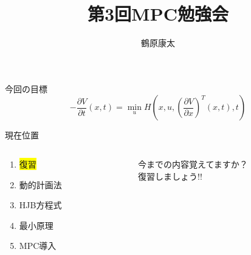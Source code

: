 \documentclass[dvipdfmx,12pt]{beamer}
\title{第3回MPC勉強会}
\author{鶴原康太}
\begin{document}
    \frame{\maketitle}

    \begin{frame}{今回の目標}
        \begin{equation*}
            -\frac{\partial V}{\partial t}\left(x,t\right) = \min _u H\left(x, u, \left( \frac{\partial V}{\partial x} \right)^T\left(x, t\right), t \right)
        \end{equation*}
    \end{frame}

    \begin{frame}{現在位置}
        \begin{columns}
            \begin{column}{.4\textwidth}
                \begin{enumerate}
                    \item \colorbox{yellow}{復習}
                    \item 動的計画法
                    \item HJB方程式
                    \item 最小原理
                    \item MPC導入
                \end{enumerate}
            \end{column}
    
            \begin{column}{.6\textwidth}
                今までの内容覚えてますか？\\
                復習しましょう!!
            \end{column}
        \end{columns}
    \end{frame}
\end{document}
